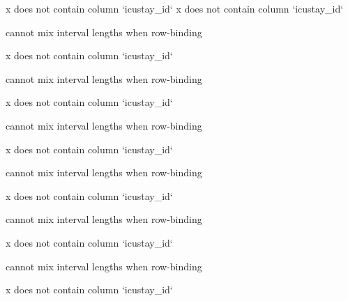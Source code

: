 \documentclass[
]{jss}
\begin{document}
\begin{CodeChunk}
\begin{CodeOutput}
x does not contain column `icustay_id`
x does not contain column `icustay_id`
\end{CodeOutput}

\begin{CodeOutput}
cannot mix interval lengths when row-binding
\end{CodeOutput}

\begin{CodeOutput}
x does not contain column `icustay_id`
\end{CodeOutput}

\begin{CodeOutput}
cannot mix interval lengths when row-binding
\end{CodeOutput}

\begin{CodeOutput}
x does not contain column `icustay_id`
\end{CodeOutput}

\begin{CodeOutput}
cannot mix interval lengths when row-binding
\end{CodeOutput}

\begin{CodeOutput}
x does not contain column `icustay_id`
\end{CodeOutput}

\begin{CodeOutput}
cannot mix interval lengths when row-binding
\end{CodeOutput}

\begin{CodeOutput}
x does not contain column `icustay_id`
\end{CodeOutput}

\begin{CodeOutput}
cannot mix interval lengths when row-binding
\end{CodeOutput}

\begin{CodeOutput}
x does not contain column `icustay_id`
\end{CodeOutput}

\begin{CodeOutput}
cannot mix interval lengths when row-binding
\end{CodeOutput}

\begin{CodeOutput}
x does not contain column `icustay_id`
\end{CodeOutput}


\end{CodeChunk}
\end{document}
